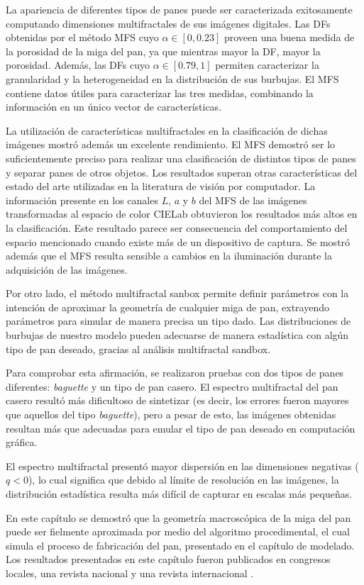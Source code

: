 La apariencia de diferentes tipos de panes puede ser caracterizada exitosamente computando dimensiones multifractales de sus imágenes digitales.
Las DFs obtenidas por el método MFS cuyo $\alpha \in [0,0.23]$ proveen una buena medida de la porosidad de la miga del pan, ya que mientras mayor la DF, mayor la porosidad.
Además, las DFs cuyo $\alpha \in [0.79,1]$ permiten caracterizar la granularidad y la heterogeneidad en la distribución de sus burbujas.
El MFS contiene datos útiles para caracterizar las tres medidas, combinando la información en un único vector de características.

La utilización de características multifractales en la clasificación de dichas imágenes mostró además un excelente rendimiento.
El MFS demostró ser lo suficientemente preciso para realizar una clasificación de distintos tipos de panes y separar panes de otros objetos.
Los resultados superan otras características del estado del arte utilizadas en la literatura de visión por computador.
La información presente en los canales $L$, $a$ y $b$ del MFS de las imágenes transformadas al espacio de color CIELab obtuvieron los resultados más altos en la clasificación.
Este resultado parece ser consecuencia del comportamiento del espacio mencionado cuando existe más de un dispositivo de captura.
Se mostró además que el MFS resulta sensible a cambios en la iluminación durante la adquisición de las imágenes.

Por otro lado, el método multifractal sanbox permite definir parámetros con la intención de aproximar la geometría de cualquier miga de pan, extrayendo parámetros para simular de manera precisa un tipo dado.
Las distribuciones de burbujas de nuestro modelo pueden adecuarse de manera estadística con algún tipo de pan deseado, gracias al análisis multifractal sandbox.

Para comprobar esta afirmación, se realizaron pruebas con dos tipos de panes diferentes: {\em baguette} y un tipo de pan casero.
El espectro multifractal del pan casero resultó más dificultoso de sintetizar (es decir, los errores fueron mayores que aquellos del tipo {\em baguette}), pero a pesar de esto, las imágenes obtenidas resultan más que adecuadas para emular el tipo de pan deseado en computación gráfica.

El espectro multifractal presentó mayor dispersión en las dimensiones negativas ($q < 0$), 
lo cual significa que debido al límite de resolución en las imágenes, la distribución estadística resulta más difícil de capturar en escalas más pequeñas.

En este capítulo se demostró que la geometría macroscópica de la miga del pan puede ser fielmente aproximada por medio del algoritmo procedimental, el cual simula el proceso de fabricación del pan, presentado en el capítulo de modelado.
Los resultados presentados en este capítulo fueron publicados en congresos locales, una revista nacional y una revista internacional \cite{Baravalle2012, Baravalle2012_2, Baravalle2012_3, Baravalle2015}.


